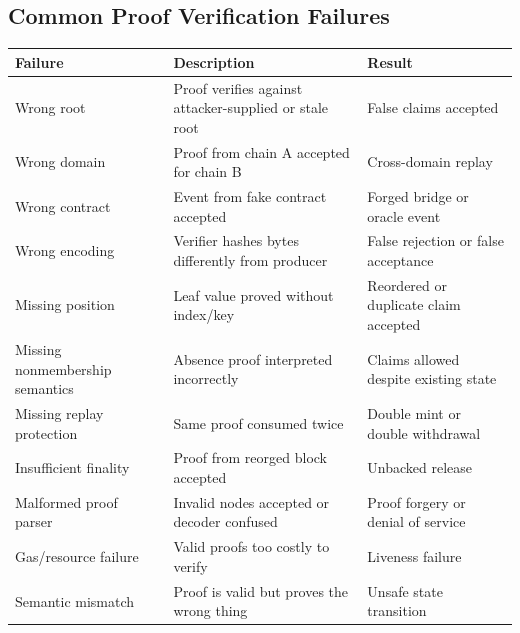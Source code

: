 \subsection{Common Proof Verification Failures}

{\def\LTcaptype{none} %
\begin{longtable}[]{@{}
  >{\raggedright\arraybackslash}p{}
  >{\raggedright\arraybackslash}p{}
  >{\raggedright\arraybackslash}p{}@{}}
\toprule\noalign{}
\begin{minipage}[b]{\linewidth}\raggedright
Failure
\end{minipage} & \begin{minipage}[b]{\linewidth}\raggedright
Description
\end{minipage} & \begin{minipage}[b]{\linewidth}\raggedright
Result
\end{minipage} \\
\midrule\noalign{}
\endhead
\bottomrule\noalign{}
\endlastfoot
Wrong root & Proof verifies against attacker-supplied or stale root &
False claims accepted \\
Wrong domain & Proof from chain A accepted for chain B & Cross-domain
replay \\
Wrong contract & Event from fake contract accepted & Forged bridge or
oracle event \\
Wrong encoding & Verifier hashes bytes differently from producer & False
rejection or false acceptance \\
Missing position & Leaf value proved without index/key & Reordered or
duplicate claim accepted \\
Missing nonmembership semantics & Absence proof interpreted incorrectly
& Claims allowed despite existing state \\
Missing replay protection & Same proof consumed twice & Double mint or
double withdrawal \\
Insufficient finality & Proof from reorged block accepted & Unbacked
release \\
Malformed proof parser & Invalid nodes accepted or decoder confused &
Proof forgery or denial of service \\
Gas/resource failure & Valid proofs too costly to verify & Liveness
failure \\
Semantic mismatch & Proof is valid but proves the wrong thing & Unsafe
state transition \\
\end{longtable}
}

